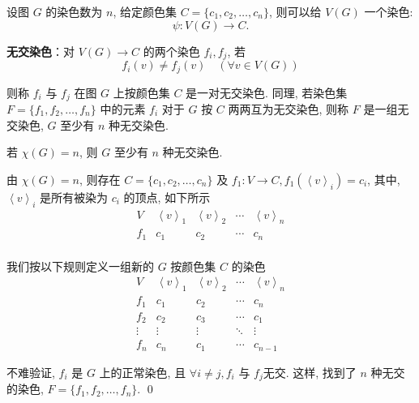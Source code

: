\documentclass[12pt,a4paper]{article}%
\begin{document}
设图 $G$ 的染色数为 $n$, 给定颜色集 $C = \{ c_1,c_2,\ldots ,c_n\}$, 则可以给 $V(G)$ 一个染色:
        $$ \psi: V(G) \rightarrow C. $$
        
        
\textbf{无交染色}：对 $V(G) \rightarrow C$ 的两个染色 $f_i,f_j$, 若
$$f_i(v) \neq f_j(v) \quad (\forall v \in V(G))$$

则称 $f_i$ 与 $f_j$ 在图 $G$ 上按颜色集 $C$ 是一对无交染色. 同理, 若染色集 $F = \{  f_1,f_2,\ldots,f_n \}$ 中的元素 $f_i$ 对于 $G$ 按 $C$ 两两互为无交染色, 则称 $F$ 是一组无交染色, $G$ 至少有 $n$ 种无交染色.

\begin{lemma}\label{thm3}
    若 $\chi(G)=n $, 则 $G$ 至少有 $n$ 种无交染色.   
\end{lemma}

\begin{pf}
    由 $\chi(G)=n $, 则存在 $C = \{ c_1,c_2,\ldots ,c_n\}$ 及 $f_1 :V \rightarrow C,f_1(\left\langle v\right\rangle _i) = c_i$, 其中, $\left\langle v\right\rangle _i$ 是所有被染为 $c_i$ 的顶点, 如下所示
    $$
    \begin{matrix}
        V &\left\langle v\right\rangle _1  &\left\langle v\right\rangle _2 &\cdots &\left\langle v\right\rangle _n\\
        f_1 &c_1 &c_2 &\cdots &c_n\\

    \end{matrix}
    $$
    
    我们按以下规则定义一组新的 $G$ 按颜色集 $C$ 的染色
    $$
    \begin{matrix}
        V &\left\langle v\right\rangle _1  &\left\langle v\right\rangle _2 &\cdots &\left\langle v\right\rangle _n\\
        f_1 &c_1 &c_2 &\cdots &c_n\\
        f_2 &c_2 &c_3 &\cdots &c_1\\
        \vdots &\vdots &\vdots &\ddots &\vdots\\
        f_n &c_n &c_1 &\cdots &c_{n-1}
    \end{matrix}
    $$
    
    不难验证, $f_i$ 是 $G$ 上的正常染色, 且 $\forall i \neq j,f_i$ 与 $f_j$无交. 这样, 找到了 $n$ 种无交的染色, $F = \{  f_1,f_2,\ldots,f_n \}$.  \qed
\end{pf}
\end{document}
